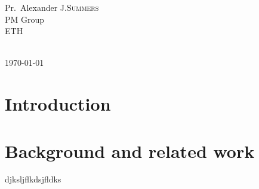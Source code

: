 \documentclass[titlepage,11pt,a4paper]{report}
\theoremstyle{plain}
\newcommand\blankpage{%
    \null
    \thispagestyle{empty}%
    \addtocounter{page}{-1}%
    \newpage}
\begin{document}
\begin{titlepage}
\begin{minipage}{0.4\textwidth}
\begin{flushright}
\large
Pr.~Alexander J.\textsc{Summers}\\ %
\small
PM Group\\
ETH
\end{flushright}
\end{minipage}\\[2cm]



{\large \today}\\[2cm] %


 

\vfill %

\afterpage{\blankpage}

\end{titlepage}




\tableofcontents

\afterpage{\blankpage}

\chapter{Introduction}

\chapter{Background and related work}
\label{ch:background}
djksljflkdsjfldks
\end{document}
